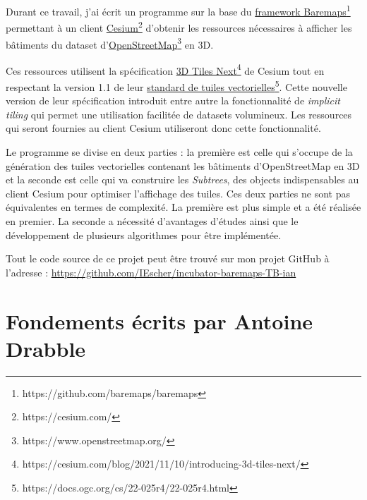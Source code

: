 
Durant ce travail, j'ai écrit un programme sur la base du \href{https://github.com/baremaps/baremaps}{framework Baremaps}\footnote{https://github.com/baremaps/baremaps} permettant à un client \href{https://cesium.com/}{Cesium}\footnote{https://cesium.com/} d'obtenir les ressources nécessaires à afficher les bâtiments du dataset d'\href{https://www.openstreetmap.org/}{OpenStreetMap}\footnote{https://www.openstreetmap.org/} en 3D.

Ces ressources utilisent la spécification \href{https://cesium.com/blog/2021/11/10/introducing-3d-tiles-next/}{3D Tiles Next}\footnote{https://cesium.com/blog/2021/11/10/introducing-3d-tiles-next/} de Cesium tout en respectant la version 1.1 de leur \href{https://docs.ogc.org/cs/22-025r4/22-025r4.html}{standard de tuiles vectorielles}\footnote{https://docs.ogc.org/cs/22-025r4/22-025r4.html}. Cette nouvelle version de leur spécification introduit entre autre la fonctionnalité de \textit{implicit tiling} \cite{implicit-tiling-gh} qui permet une utilisation facilitée de datasets volumineux. Les ressources qui seront fournies au client Cesium utiliseront donc cette fonctionnalité.

Le programme se divise en deux parties : la première est celle qui s'occupe de la génération des tuiles vectorielles contenant les bâtiments d'OpenStreetMap en 3D et la seconde est celle qui va construire les \textit{Subtrees}, des objects indispensables au client Cesium pour optimiser l'affichage des tuiles. Ces deux parties ne sont pas équivalentes en termes de complexité. La première est plus simple et a été réalisée en premier. La seconde a nécessité d'avantages d'études ainsi que le développement de plusieurs algorithmes pour être implémentée.

Tout le code source de ce projet peut être trouvé sur mon projet GitHub à l'adresse : \href{https://github.com/IEscher/incubator-baremaps-TB-ian}{https://github.com/IEscher/incubator-baremaps-TB-ian}

\newpage
\section*{Fondements écrits par Antoine Drabble}

